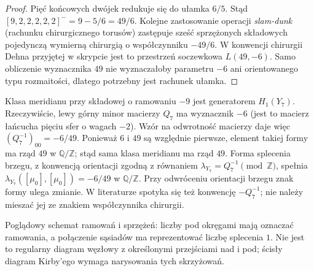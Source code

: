 \begin{proof}
Pięć końcowych dwójek redukuje się do ułamka $6/5$.
Stąd $[9,2,2,2,2,2]^-=9-5/6=49/6$.
Kolejne zastosowanie operacji \emph{slam-dunk}
(rachunku chirurgicznego torusów) zastępuje sześć
sprzężonych składowych pojedynczą wymierną chirurgią
o współczynniku $-49/6$. W konwencji chirurgii Dehna
przyjętej w skrypcie jest to przestrzeń soczewkowa
$L(49,-6)$. Samo obliczenie wyznacznika $49$ nie
wyznaczałoby parametru $-6$ ani orientowanego typu
rozmaitości, dlatego potrzebny jest rachunek ułamka.
\end{proof}

\begin{przyklad}
Klasa meridianu przy składowej o ramowaniu $-9$
jest generatorem $H_1(Y_7)$. Rzeczywiście, lewy górny
minor macierzy $Q_7$ ma wyznacznik $-6$ (jest to macierz
łańcucha pięciu sfer o wagach $-2$). Wzór na odwrotność
macierzy daje więc $(Q_7^{-1})_{00}=-6/49$.
Ponieważ $6$ i $49$ są względnie pierwsze, element
takiej formy ma rząd $49$ w $\mathbb Q/\mathbb Z$;
stąd sama klasa meridianu ma rząd $49$.
Forma splecenia brzegu, z konwencją orientacji zgodną
z równaniem $\lambda_{Y_7}=Q_7^{-1}\pmod{\mathbb Z}$,
spełnia $\lambda_{Y_7}([\mu_0],[\mu_0])=-6/49$
w $\mathbb Q/\mathbb Z$. Przy odwróceniu orientacji
brzegu znak formy ulega zmianie. W literaturze spotyka
się też konwencję $-Q_7^{-1}$; nie należy mieszać
jej ze znakiem współczynnika chirurgii.
\end{przyklad}

\begin{center}

{\footnotesize Poglądowy schemat ramowań i sprzężeń: liczby pod okręgami
mają oznaczać ramowania, a połączenie sąsiadów ma
reprezentować liczbę splecenia $1$. Nie jest to regularny
diagram węzłowy z określonymi przejściami nad i pod;
ścisły diagram Kirby'ego wymaga narysowania tych skrzyżowań.}
\end{center}

